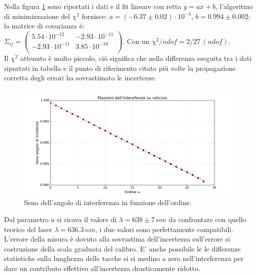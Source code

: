 \documentclass[10pt,a4paper]{article}
\begin{document}
Nella figura \ref{interferenza} sono riportati i dati e il fit lineare con retta $y = ax+b$, l'algoritmo di minimizzazione del $\chi^2$ fornisce: $a = ( -6.37 \pm 0.02 ) \cdot 10^{-4}$, $b = 0.994 \pm 0.002$; la matrice di covarianza è:\\ $ \Sigma_{ij} = \left( \begin{array}{cc}
5.54 \cdot 10^{-12} & -2.93 \cdot 10^{-11} \\ 
-2.93 \cdot 10^{-11} & 3.85 \cdot 10^{-10}\\
\end{array} \right)$. Con un $\chi^2/ndof = 2/27 \, (ndof)$.\\
Il $\chi^2$ ottenuto è molto piccolo, ciò significa che nella differenza eseguita tra i dati riportati in tabella e il punto di riferimento citato più volte la propagazione corretta degli errori ha sovrastimato le incertezze.\\


\begin{figure}[!htb]
  \centering
  \includegraphics[scale=.5]{plot.png}
\caption{Seno dell'angolo di interferenza in funzione dell'ordine.}
\label{interferenza}
\end{figure}

Dal parametro $a$ si ricava il valore di $\lambda = 638 \pm 7 \, nm$ da confrontare con quello teorico del laser $\lambda = 636.3 \, nm$, i due valori sono perfettamente compatibili. L'errore della misura è dovuto alla sovrastima dell'incertezza sull'errore si costruzione della scala graduata del calibro. E' anche possibile le le differenze statistiche sulla lunghezza delle tacche si si medino a zero nell'interferenza per dare un contributo effettivo all'incertezza drasticamente ridotto.\\
\end{document}

